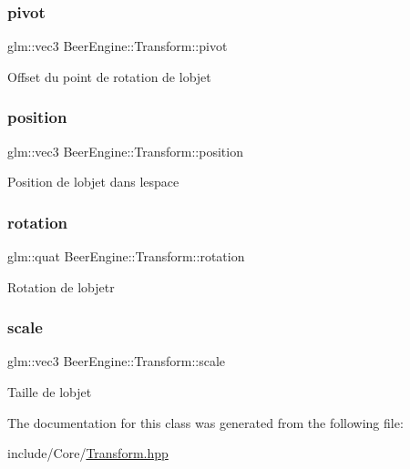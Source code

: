 \subsubsection{\texorpdfstring{pivot}{pivot}}
{\footnotesize\ttfamily glm\+::vec3 Beer\+Engine\+::\+Transform\+::pivot}

Offset du point de rotation de l\textquotesingle{}objet \mbox{\label{class_beer_engine_1_1_transform_ab5d559938ee0d636faaf10750733d974}} 
\subsubsection{\texorpdfstring{position}{position}}
{\footnotesize\ttfamily glm\+::vec3 Beer\+Engine\+::\+Transform\+::position}

Position de l\textquotesingle{}objet dans l\textquotesingle{}espace \mbox{\label{class_beer_engine_1_1_transform_a0b2499263e149d0d25ad0661f7f26069}} 
\subsubsection{\texorpdfstring{rotation}{rotation}}
{\footnotesize\ttfamily glm\+::quat Beer\+Engine\+::\+Transform\+::rotation}

Rotation de l\textquotesingle{}objetr \mbox{\label{class_beer_engine_1_1_transform_aec3b8b1a22e1b01b36f483cf7684d721}} 
\subsubsection{\texorpdfstring{scale}{scale}}
{\footnotesize\ttfamily glm\+::vec3 Beer\+Engine\+::\+Transform\+::scale}

Taille de l\textquotesingle{}objet 

The documentation for this class was generated from the following file\+:\begin{DoxyCompactItemize}
\item 
include/\+Core/\mbox{\hyperlink{_transform_8hpp}{Transform.\+hpp}}\end{DoxyCompactItemize}

